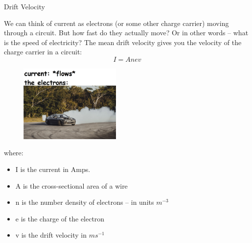 \documentclass[../Main.tex]{subfiles}
\begin{document}
\begin{frame}{Drift Velocity}
\begin{multicols}{2}
    We can think of current as electrons (or some other charge carrier) moving through a circuit. But how fast do they actually move? Or in other words -- what is the speed of electricity? \pause
    \newline \newline
    The mean drift velocity gives you the velocity of the charge carrier in a circuit:
    \begin{equation*}
        I = Anev
    \end{equation*}
    \columnbreak
    \begin{figure}
        \centering
        \includegraphics[width=5cm]{Electricity_Images/drift_velocity_meme.png}
    \end{figure}
    \end{multicols}
    \begin{multicols}{2}
    {\small where:
    \begin{itemize}
        \item I is the current in Amps. 
        \item A is the cross-sectional area of a wire
    \columnbreak
        \item n is the number density of electrons -- in units $m^{-3}$
        \item e is the charge of the electron
        \item v is the drift velocity in $ms^{-1}$
    \end{itemize}}
    \end{multicols}
\end{frame}
\end{document}
